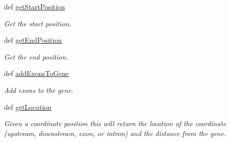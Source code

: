 \begin{DoxyCompactItemize}
def \hyperlink{classgene_1_1_gene_aa719d094a9f3cd14d28b09a9f04b90f0}{get\+Start\+Position}
\begin{DoxyCompactList}\small\item\em Get the start position. \end{DoxyCompactList}\item 
def \hyperlink{classgene_1_1_gene_ad2ebf59eeeb3a10a8ad586eaf066554c}{get\+End\+Position}
\begin{DoxyCompactList}\small\item\em Get the end position. \end{DoxyCompactList}\item 
def \hyperlink{classgene_1_1_gene_a4f1b596217ec43b206f9277128b82640}{add\+Exons\+To\+Gene}
\begin{DoxyCompactList}\small\item\em Add exons to the gene. \end{DoxyCompactList}\item 
def \hyperlink{classgene_1_1_gene_a64e9f4b793f36ef68a5b6d837f5d3d07}{get\+Location}
\begin{DoxyCompactList}\small\item\em Given a coordinate position this will return the location of the coordinate (upstream, downstream, exon, or intron) and the distance from the gene. \end{DoxyCompactList}\end{DoxyCompactItemize}
